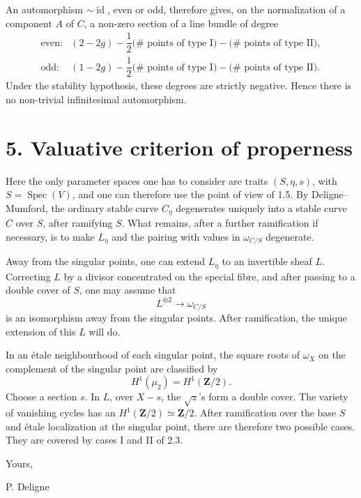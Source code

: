 \documentclass[11pt]{article}
\newcommand{\Spec}{\operatorname{Spec}}
\newcommand{\id}{\operatorname{id}}
\begin{document}
An automorphism \(\sim\id\), even or odd, therefore gives, on the normalization of a component \(A\) of \(C\), a non-zero section of a line bundle of degree
\[
\begin{array}{ll}
\text{even}:&
(2-2g)-\dfrac12\bigl(\#\text{ points of type I}\bigr)-\bigl(\#\text{ points of type II}\bigr),\\[3mm]
\text{odd}:&
(1-2g)-\dfrac12\bigl(\#\text{ points of type I}\bigr)-\bigl(\#\text{ points of type II}\bigr).
\end{array}
\]
Under the stability hypothesis, these degrees are strictly negative. Hence there is no non-trivial infinitesimal automorphism.

\section*{5. Valuative criterion of properness}

Here the only parameter spaces one has to consider are traits \((S,\eta,s)\), with \(S=\Spec(V)\), and one can therefore use the point of view of 1.5. By Deligne--Mumford, the ordinary stable curve \(C_\eta\) degenerates uniquely into a stable curve \(C\) over \(S\), after ramifying \(S\). What remains, after a further ramification if necessary, is to make \(L_\eta\) and the pairing with values in \(\omega_{C/S}\) degenerate.

Away from the singular points, one can extend \(L_\eta\) to an invertible sheaf \(L\). Correcting \(L\) by a divisor concentrated on the special fibre, and after passing to a double cover of \(S\), one may assume that
\[
  L^{\otimes2}\longrightarrow \omega_{C/S}
\]
is an isomorphism away from the singular points. After ramification, the unique extension of this \(L\) will do.

In an étale neighbourhood of each singular point, the square roots of \(\omega_X\) on the complement of the singular point are classified by
\[
  H^1(\mu_2)=H^1(\mathbf Z/2).
\]
Choose a section \(s\). In \(L\), over \(X-s\), the \(\sqrt{z}\)'s form a double cover. The variety of vanishing cycles has an \(H^1(\mathbf Z/2)\simeq\mathbf Z/2\). After ramification over the base \(S\) and étale localization at the singular point, there are therefore two possible cases. They are covered by cases I and II of 2.3.

Yours,

\hfill P. Deligne
\end{document}
